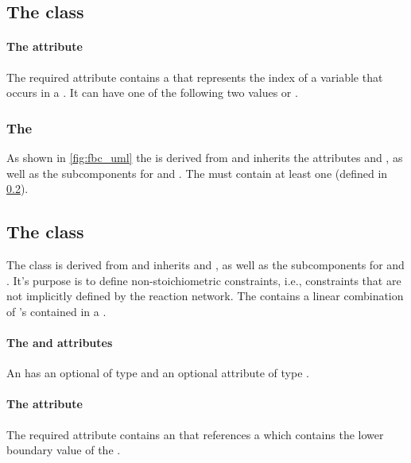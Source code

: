 \subsection{The \FBC {} class}
\paragraph{The  attribute}
The required  attribute contains a  that
represents the index of a variable that occurs in a \FluxObjective. It can have one
of the following two values  or .

\subsubsection{The \FBC {}}
\label{listofuserconstraints-class}
As shown in \ref{fig:fbc_uml} the \ListOfUserConstraints is derived from \SBase
and inherits the attributes  and , as well as
the subcomponents for \Annotation and \Notes. The
\ListOfUserConstraints must contain at least one \UserConstraint (defined in
\ref{userconstraint-class}).

\subsection{The \FBC {} class}
\label{userconstraint-class}
\label{listoftuples-class}

The \FBC \UserConstraint class is derived from \SBML \SBase and inherits
 and , as well as the subcomponents for
\Annotation and \Notes. It's purpose is to define non-stoichiometric constraints, i.e., constraints that are not implicitly defined by the reaction network. The \UserConstraint contains a linear combination of \UserConstraintComponent's contained in a \ListOfUserConstraintComponents.

\paragraph{The  and  attributes}
An \Objective has an optional  of type
 and an optional attribute  of type .

\paragraph{The  attribute}
The required  attribute contains an  that references a \Parameter which contains the lower boundary value of the \UserConstraint.

